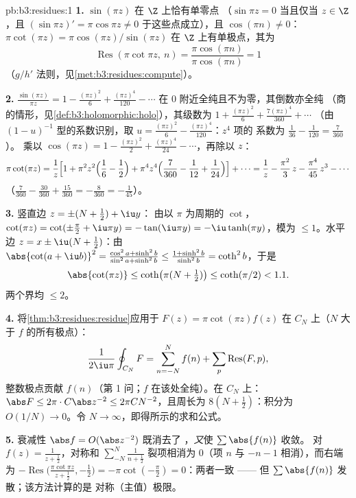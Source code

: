 \begin{solution}{pb:b3:residues:1}
\textbf{1.} $\sin(\pi z)$ 在 $\Z$ 上恰有单零点
（$\sin\pi z = 0$ 当且仅当 $z \in \Z$，且 $(\sin\pi z)' = \pi\cos\pi
z \neq 0$ 于这些点成立），且 $\cos(\pi n) \neq 0$：$\pi\cot(\pi z) =
\pi\cos(\pi z)/\sin(\pi z)$ 在 $\Z$ 上有单极点，其为
\[
\operatorname{Res}(\pi\cot\pi z,\ n)
= \frac{\pi\cos(\pi n)}{\pi\cos(\pi n)} = 1
\]
（$g/h'$ 法则，见\cref{met:b3:residues:compute}）。

\textbf{2.} $\frac{\sin(\pi z)}{\pi z} = 1 - \frac{(\pi z)^2}6
+ \frac{(\pi z)^4}{120} - \cdots$ 在
$0$ 附近全纯且不为零，其倒数亦全纯
（商的情形，见\cref{def:b3:holomorphic:holo}），其级数为 $1 +
\frac{(\pi z)^2}{6} + \frac{7(\pi z)^4}{360} + \cdots$
（由 $(1 - u)^{-1}$ 型的系数识别，取 $u =
\frac{(\pi z)^2}6 - \frac{(\pi z)^4}{120}$：$z^4$ 项的
系数为 $\frac1{36} - \frac1{120} = \frac{7}{360}$）。
乘以 $\cos(\pi z) = 1 - \frac{(\pi z)^2}2 + \frac{(\pi
z)^4}{24} - \cdots$，再除以 $z$：
\[
\pi\cot(\pi z) = \frac1z\Bigl[1 + \pi^2z^2\Bigl(\frac16 -
\frac12\Bigr) + \pi^4z^4\Bigl(\frac7{360} - \frac1{12} +
\frac1{24}\Bigr)\Bigr] + \cdots
= \frac1z - \frac{\pi^2}3\,z - \frac{\pi^4}{45}\,z^3 -
\cdots
\]
（$\frac7{360} - \frac{30}{360} + \frac{15}{360} =
-\frac8{360} = -\frac1{45}$）。

\textbf{3.} 竖直边 $z = \pm(N + \frac12) + \iu y$：
由以 $\pi$ 为周期的 $\cot$，$\cot(\pi z) = \cot(\pm\frac\pi2
+ \iu\pi y) = -\tan(\iu\pi y) = -\iu\tanh(\pi y)$，模为
$\leq 1$。水平边 $z = x \pm \iu(N + \frac12)$：由
$\abs{\cot(a + \iu b)}^2 = \frac{\cos^2a +
\sinh^2b}{\sin^2a + \sinh^2b} \leq \frac{1 +
\sinh^2b}{\sinh^2b} = \coth^2 b$，于是
\[
\abs{\cot(\pi z)} \leq \coth\bigl(\pi(N + \tfrac12)\bigr)
\leq \coth(\pi/2) < 1.1 .
\]
两个界均 $\leq 2$。

\textbf{4.} 将\cref{thm:b3:residues:residue}应用于 $F(z) =
\pi\cot(\pi z)f(z)$ 在 $C_N$ 上（$N$ 大于 $f$ 的所有极点）：
\[
\frac1{2\iu\pi}\oint_{C_N}F = \sum_{n=-N}^{N}f(n) +
\sum_p\operatorname{Res}(F, p),
\]
整数极点贡献 $f(n)$（第 1 问；$f$
在该处全纯）。在 $C_N$ 上：$\abs F \leq 2\pi\cdot
C\abs z^{-2} \leq 2\pi C N^{-2}$，且周长为 $8(N +
\frac12)$：积分为 $O(1/N) \to 0$。令 $N \to
\infty$，即得所示的求和公式。

\textbf{5.} 衰减性 $\abs f = O(\abs z^{-2})$ 既消去了
，\emph{又}使 $\sum\abs{f(n)}$ 收敛。
对 $f(z) = \frac1{z + \frac12}$，对称和
$\sum_{-N}^N\frac1{n + \frac12}$ 裂项相消为 $0$（项
$n$ 与 $-n - 1$ 相消），而右端为
$-\operatorname{Res}\bigl(\frac{\pi\cot\pi z}{z + \frac12},
-\frac12\bigr) = -\pi\cot(-\frac\pi2) = 0$：两者一致 ——
但 $\sum\abs{f(n)}$ 发散；该方法计算的是
对称（主值）极限。


\end{solution}
